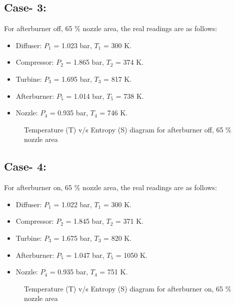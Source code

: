 \documentclass[12pt,a4paper]{article}
\begin{document}
\subsection{Case- 3:}
For afterburner off, 65 \% nozzle area, the real readings are as follows:
\begin{itemize}
\item Diffuser: $P_1$ = 1.023 bar, $T_1$ = 300 K.
\item Compressor: $P_2$ = 1.865 bar, $T_2$ = 374 K.
\item Turbine: $P_3$ = 1.695 bar, $T_3$ = 817 K.
\item Afterburner: $P_5$ = 1.014 bar, $T_5$ = 738 K.
\item Nozzle: $P_4$ = 0.935 bar, $T_4$ = 746 K.
\end{itemize}
\begin{figure}[!ht]
	\begin{center}
	\end{center}
	\caption{Temperature (T) v/s Entropy (S) diagram for afterburner off, 65 \% nozzle area}
\end{figure}
\subsection{Case- 4:}
For afterburner on, 65 \% nozzle area, the real readings are as follows:
\begin{itemize}
\item Diffuser: $P_1$ = 1.022 bar, $T_1$ = 300 K.
\item Compressor: $P_2$ = 1.845 bar, $T_2$ = 371 K.
\item Turbine: $P_3$ = 1.675 bar, $T_3$ = 820 K.
\item Afterburner: $P_5$ = 1.047 bar, $T_5$ = 1050 K.
\item Nozzle: $P_4$ = 0.935 bar, $T_4$ = 751 K.
\end{itemize}
\clearpage
\begin{figure}[!ht]
	\begin{center}
	\end{center}
	\caption{Temperature (T) v/s Entropy (S) diagram for afterburner on, 65 \% nozzle area}
\end{figure}
\end{document}
